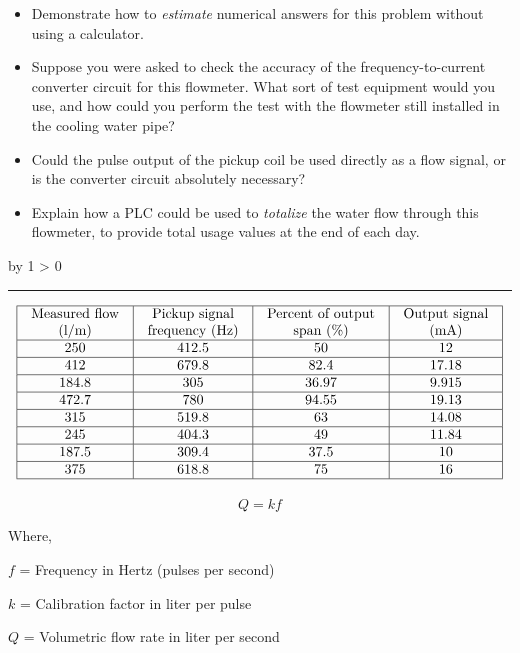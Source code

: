 \documentclass[12pt,a4paper]{article}
\def\svar{
           \advance\answnum by 1
           \ifnum \answnum > 0
                \hrule
                \vskip 3pt
                \leftline{Svar \the\answnum}
                \vskip 3pt \fi}
\begin{document}
\begin{itemize}
\item{} Demonstrate how to {\it estimate} numerical answers for this problem without using a calculator.
\item{} Suppose you were asked to check the accuracy of the frequency-to-current converter circuit for this flowmeter.  What sort of test equipment would you use, and how could you perform the test with the flowmeter still installed in the cooling water pipe?
\item{} Could the pulse output of the pickup coil be used directly as a flow signal, or is the converter circuit absolutely necessary?
\item{} Explain how a PLC could be used to {\it totalize} the water flow through this flowmeter, to provide total usage values at the end of each day.
\end{itemize}

\vskip 10pt \filbreak 





\svar{} 


$$\vbox{\offinterlineskip
\halign{\strut
\vrule \quad\hfil # \ \hfil & 
\vrule \quad\hfil # \ \hfil & 
\vrule \quad\hfil # \ \hfil & 
\vrule \quad\hfil # \ \hfil \vrule \cr
\noalign{\hrule}
%
Measured flow & Pickup signal & Percent of output & Output signal \cr
%
(l/m) & frequency (Hz) & span (\%) & (mA) \cr
%
\noalign{\hrule}
%
250 & 412.5 & 50 & 12 \cr
%
\noalign{\hrule}
%
412 & 679.8 & 82.4 & 17.18 \cr
%
\noalign{\hrule}
%
184.8 & 305 & 36.97 & 9.915 \cr
%
\noalign{\hrule}
%
472.7 & 780 & 94.55 & 19.13 \cr
%
\noalign{\hrule}
%
315 & 519.8 & 63 & 14.08 \cr
%
\noalign{\hrule}
%
245 & 404.3 & 49 & 11.84 \cr
%
\noalign{\hrule}
%
187.5 & 309.4 & 37.5 & 10 \cr
%
\noalign{\hrule}
%
375 & 618.8 & 75 & 16 \cr
%
\noalign{\hrule}
} %
}$$ %

$$Q = kf$$

\noindent
Where,

$f$ = Frequency in Hertz (pulses per second)

$k$ = Calibration factor in liter per pulse

$Q$ = Volumetric flow rate in liter per second
\end{document}
